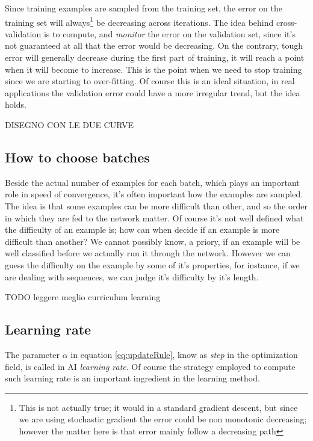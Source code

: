 Since training examples are sampled from the training set, the error on the training set will always\footnote{This is not actually true; it would in a standard gradient descent, but since we are using stochastic gradient the error could be non monotonic decreasing; however the matter here is that error mainly follow a decreasing path} be decreasing across iterations. The idea behind cross-validation is to compute, and \textit{monitor} the error on the validation set, since it's not guaranteed at all that the error would be decreasing. On the contrary, tough error will generally decrease during the first part of training, it will reach a point when it will become to increase. This is the point when we need to stop training since we are starting to over-fitting. Of course this is an ideal situation, in real applications the validation error could have a more irregular trend, but the idea holds.


DISEGNO CON LE DUE CURVE


\subsection{How to choose batches}

Beside the actual number of examples for each batch, which plays an important role in speed of convergence, it's often important how the examples are sampled.
The idea is that some examples can be more difficult than other, and so the order in which they are fed to the network matter. Of course it's not well defined what the difficulty of an example is; how can when decide if an example is more difficult than another?  We cannot possibly know, a priory, if an example will be well classified before we actually run it through the network. However we can guess the difficulty on the example by some of it's properties, for instance, if we are dealing with sequences, we can judge it's difficulty by it's length.

TODO leggere meglio curriculum learning


\subsection{Learning rate}

The parameter $\alpha$ in equation \ref{eq:updateRule}, know as \textit{step} in the optimization field, is called in AI \textit{learning rate}. Of course the strategy employed to compute such learning rate is an important ingredient in the learning method. 


